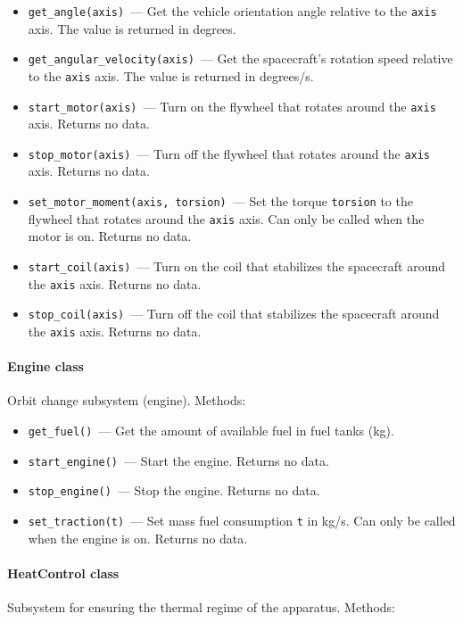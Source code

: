 \documentclass[12pt,a4paper]{article}
\begin{document}
\begin{itemize}
\item \verb'get_angle(axis)'~--- Get the vehicle orientation angle relative to the \verb'axis' axis. The value is returned in degrees.
\item \verb'get_angular_velocity(axis)'~--- Get the spacecraft's rotation speed relative to the \verb'axis' axis. The value is returned in degrees/s.
\item \verb'start_motor(axis)'~--- Turn on the flywheel that rotates around the \verb'axis' axis. Returns no data.
\item \verb'stop_motor(axis)'~--- Turn off the flywheel that rotates around the \verb'axis' axis. Returns no data.
\item \verb'set_motor_moment(axis, torsion)'~--- Set the torque \verb'torsion' to the flywheel that rotates around the \verb'axis' axis. Can only be called when the motor is on. Returns no data.
\item \verb'start_coil(axis)'~--- Turn on the coil that stabilizes the spacecraft around the \verb'axis' axis. Returns no data.
\item \verb'stop_coil(axis)'~--- Turn off the coil that stabilizes the spacecraft around the \verb'axis' axis. Returns no data.
\end{itemize}

\paragraph{Engine class}

Orbit change subsystem (engine). Methods:

\begin{itemize}
\item \verb'get_fuel()'~--- Get the amount of available fuel in fuel tanks (kg).
\item \verb'start_engine()'~--- Start the engine. Returns no data.
\item \verb'stop_engine()'~--- Stop the engine. Returns no data.
\item \verb'set_traction(t)'~--- Set mass fuel consumption \verb't' in kg/s. Can only be called when the engine is on. Returns no data.
\end{itemize}

\paragraph{HeatControl class}

Subsystem for ensuring the thermal regime of the apparatus. Methods:
\end{document}
